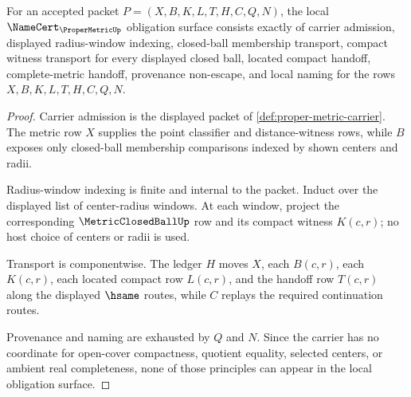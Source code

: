 \begin{theorem}
\label{thm:proper-metric-namecert-obligations}
For an accepted packet $P=(X,B,K,L,T,H,C,Q,N)$, the local $\NameCert_{\ProperMetricUp}$ obligation surface consists exactly of carrier admission, displayed radius-window indexing, closed-ball membership transport, compact witness transport for every displayed closed ball, located compact handoff, complete-metric handoff, provenance non-escape, and local naming for the rows $X,B,K,L,T,H,C,Q,N$.
\end{theorem}
\begin{proof}
Carrier admission is the displayed packet of \autoref{def:proper-metric-carrier}. The metric row $X$ supplies the point classifier and distance-witness rows, while $B$ exposes only closed-ball membership comparisons indexed by shown centers and radii.

Radius-window indexing is finite and internal to the packet. Induct over the displayed list of center-radius windows. At each window, project the corresponding $\MetricClosedBallUp$ row and its compact witness $K(c,r)$; no host choice of centers or radii is used.

Transport is componentwise. The ledger $H$ moves $X$, each $B(c,r)$, each $K(c,r)$, each located compact row $L(c,r)$, and the handoff row $T(c,r)$ along the displayed $\hsame$ routes, while $C$ replays the required continuation routes.

Provenance and naming are exhausted by $Q$ and $N$. Since the carrier has no coordinate for open-cover compactness, quotient equality, selected centers, or ambient real completeness, none of those principles can appear in the local obligation surface.
\end{proof}

